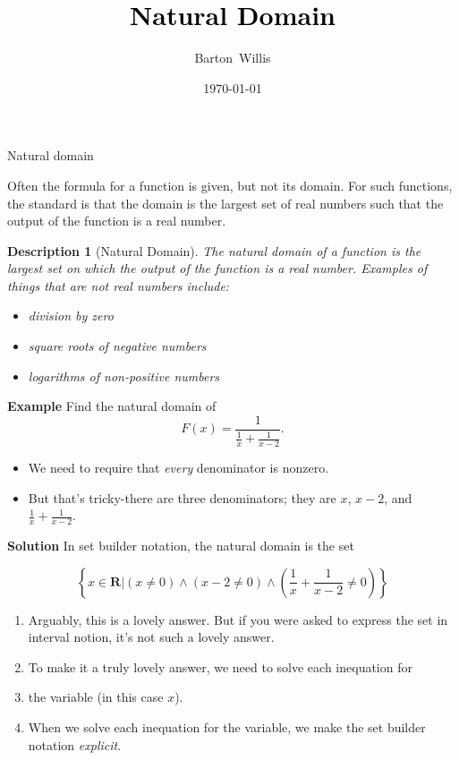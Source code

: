 \documentclass[usenames,dvipsnames,fleqn,leqno,10pt, pdflatex]{beamer}
\author[bw]{}
\title[] %
{\textcolor{black}{\textbf{Natural Domain}} \\ 
\vspace{0.2in}
}
\date{\today}
\author[] %
{Barton~Willis}
\newcommand{\reals}{\mathbf{R}}
\newenvironment{PenList}{
  \begin{enumerate}[\textcolor{UNK-blue}{\PencilRightDown}]
    \addtolength{\itemsep}{-0.0\itemsep}}
  {\end{enumerate}}
\newtheorem{describ}{Description}
\begin{document}
\frame{\titlepage}

\begin{frame}{Natural domain}

Often the formula for a function is given, but not its domain. For
such functions, the standard is that the domain is the largest
set of real numbers such that the output of the function is a real number.

\begin{describ}[Natural Domain] The \emph{natural domain} of a function is the
        largest set on which the output of the function is a
        real number.  Examples of things that are \emph{not} real
        numbers include:
        \begin{itemize}
            \item division by zero
            \item square roots of negative numbers
            \item logarithms of non-positive numbers
        \end{itemize}
\end{describ}
    
\end{frame}
\begin{frame}

\textbf{Example} Find the natural domain of 
\begin{equation*}
    F(x) = \frac{1}{\frac{1}{x} + \frac{1}{x-2}}.
\end{equation*}

\begin{itemize}
    \item We need to require that \emph{every} denominator is nonzero.
    \item But that's tricky-there are three denominators; they are
    $x$, $x-2$, and $\frac{1}{x} + \frac{1}{x-2}$.
    
\end{itemize}

\textbf{Solution} In set builder notation, the natural domain is the set

\begin{equation*}
    \left\{ x \in \reals \bigg | \left(x \neq 0 \right)  
    \land \left(x-2 \neq 0 \right) \land  
    \left(\frac{1}{x} + \frac{1}{x-2} \neq 0 \right) \right\}
\end{equation*}

\begin{PenList}

    \item Arguably, this is a lovely answer. But if you were asked to express the
    set in interval notion, it's not such a lovely answer.

    \item To make it a truly lovely answer, we need to solve each inequation for 
    \item the variable (in this case  $x$).
    \item When we solve each inequation for the variable, we make the
    set builder notation \emph{explicit}.
    
\end{PenList}
\end{frame}
\end{document}
